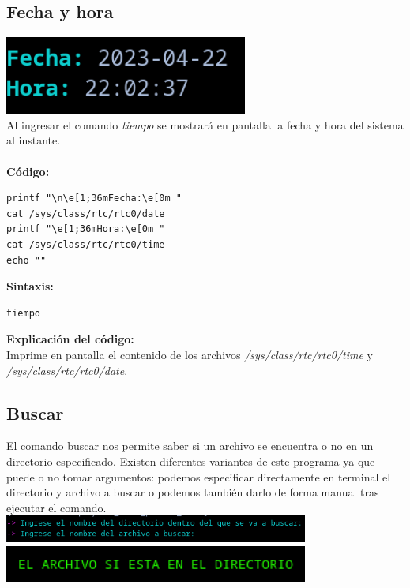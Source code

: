\documentclass[12pt,a4paper]{article}
\begin{document}
\justifying
\subsection{Fecha y hora}
    \centering
    \includegraphics[width=8cm]{img/tiempo.png}
    \\
    \justifying
    \noindent
    Al ingresar el comando \textit{tiempo} se mostrará en pantalla la fecha y hora del sistema al instante.
    \\\\
    \textbf{Código:}
    \\
    \begin{lstlisting}[style=BashInputStyle]
printf "\n\e[1;36mFecha:\e[0m "
cat /sys/class/rtc/rtc0/date
printf "\e[1;36mHora:\e[0m "
cat /sys/class/rtc/rtc0/time
echo ""
    \end{lstlisting}
    \textbf{Sintaxis:}
    \\
    \begin{lstlisting}[style=BashInputStyle]
tiempo
    \end{lstlisting}
    \noindent
    \textbf{Explicación del código:} \\
    Imprime en pantalla el contenido de los archivos \textit{/sys/class/rtc/rtc0/time} y \textit{/sys/class/rtc/rtc0/date}.
\newpage
\justifying
\subsection{Buscar}
    \justifying
    \noindent
    El comando buscar nos permite saber si un archivo se encuentra o no en un directorio especificado. Existen diferentes variantes de este programa ya que puede o no tomar argumentos: podemos especificar directamente en terminal el directorio y archivo a buscar o podemos también darlo de forma manual tras ejecutar el comando.
    \\
    
    \centering
    \includegraphics[width=10cm]{img/buscar_input.png}
    \\
    \includegraphics[width=10cm]{img/buscar_found.png}
    \\\\
\end{document}
